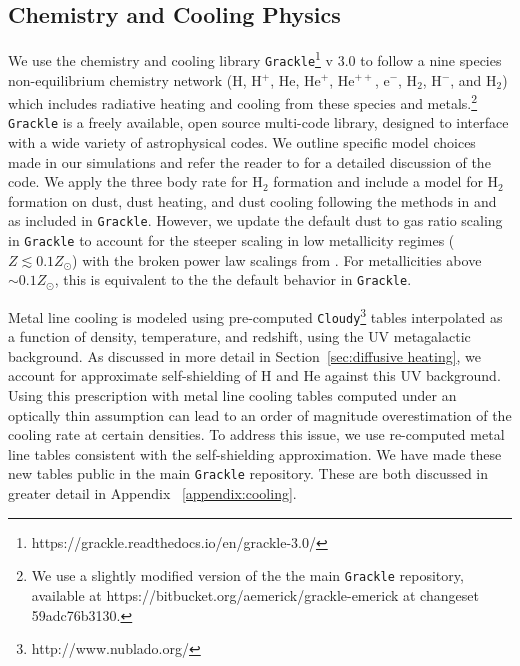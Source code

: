 \documentclass[twocolumn]{aastex61}
\begin{document}
\subsection{Chemistry and Cooling Physics}
\label{sec:chemistry}

We use the chemistry and cooling library \texttt{Grackle}\footnote{https://grackle.readthedocs.io/en/grackle-3.0/} v 3.0 to follow a nine species non-equilibrium chemistry network (H, H$^+$, He, He$^+$, He$^{++}$, e$^{-}$, H$_2$, H$^{-}$, and H$_{2}$) which includes radiative heating and cooling from these species and metals.\footnote{We use a slightly modified version of the the main \texttt{Grackle} repository, available at https://bitbucket.org/aemerick/grackle-emerick at changeset 59adc76b3130.} \texttt{Grackle} is a freely available, open source multi-code library, designed to interface with a wide variety of astrophysical codes. We outline specific model choices made in our simulations and refer the reader to \citep{GrackleMethod} for a detailed discussion of the code. We apply the \cite{Glover2008} three body rate for H$_{2}$ formation and include a model for H$_2$ formation on dust, dust heating, and dust cooling following the methods in \citet{2000ApJ...534..809O} and \citet{2005ApJ...626..627O} as included in \texttt{Grackle}. However, we update the default dust to gas ratio scaling in \texttt{Grackle} to account for the steeper scaling in low metallicity regimes ($Z \lesssim 0.1 Z_{\odot}$) with the broken power law scalings from \cite{Remy-Ruyer2014}. For metallicities above $\sim 0.1 Z_{\odot}$, this is equivalent to the the default behavior in \texttt{Grackle}. 

Metal line cooling is modeled using pre-computed \texttt{Cloudy}\footnote{http://www.nublado.org/} tables interpolated as a function of density, temperature, and redshift, using the \cite{HM2012} UV metagalactic background. As discussed in more detail in Section~\ref{sec:diffusive heating}, we account for approximate self-shielding of H and He against this UV background. Using this prescription with metal line cooling tables computed under an optically thin assumption can lead to an order of magnitude overestimation of the cooling rate at certain densities. To address this issue, we use re-computed metal line tables consistent with the self-shielding approximation.  We have made these new tables public in the main \texttt{Grackle} repository. These are both discussed in greater detail in Appendix ~\ref{appendix:cooling}.
\end{document}

